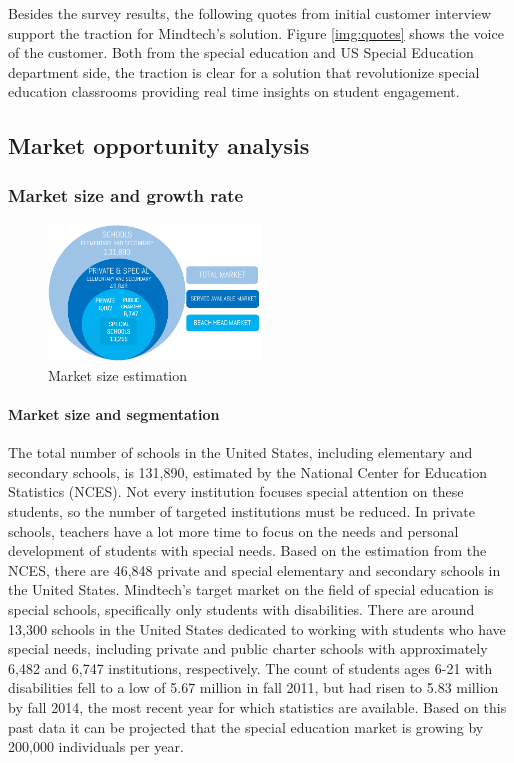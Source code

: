 \documentclass[letterpaper,10pt]{article}
\let\oldsubsection\subsection
\renewcommand{\subsection}{\def\cursectioning{subsection}\oldsubsection}
\begin{document}
Besides the survey results, the following quotes from initial customer interview support the traction for Mindtech's solution. Figure \ref{img:quotes} shows the voice of the customer. Both from the special education and US Special Education department side, the traction is clear for a solution that revolutionize special education classrooms providing real time insights on student engagement.




\subsection{Market opportunity analysis}
\subsubsection{Market size and growth rate}


\begin{figure}
\centering
\includegraphics[width=0.5\textwidth]{charts.png}
\caption{Market size estimation}
\label{img:market}
\end{figure}



\paragraph{Market size and segmentation}

The total number of schools in the United States, including elementary and secondary schools, is 131,890, estimated by the National Center for Education Statistics (NCES). Not every institution focuses special attention on these students, so the number of targeted institutions must be reduced. In private schools, teachers have a lot more time to focus on the needs and personal development of students with special needs. Based on the estimation from the NCES, there are 46,848 private and special elementary and secondary schools in the United States. Mindtech's target market on the field of special education is special schools, specifically only students with disabilities. There are around 13,300  schools in the United States dedicated to working with students who have special needs, including private and public charter schools with approximately 6,482 and 6,747 institutions, respectively. The count of students ages 6-21 with disabilities fell to a low of 5.67 million in fall 2011, but had risen to 5.83 million by fall 2014, the most recent year for which statistics are available. Based on this past data it can be projected that the special education market is growing by 200,000 individuals per year.
\end{document}
